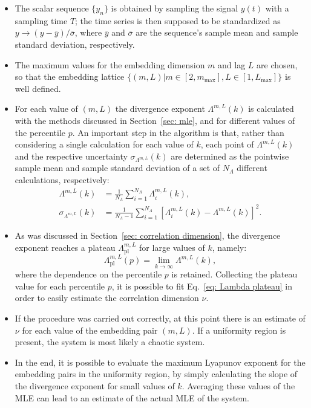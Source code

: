 \begin{itemize}

\item
The scalar sequence $\{y_n\}$ is obtained by sampling the signal $y(t)$ with a sampling time $T$;
the time series is then supposed to be standardized as
$y \rightarrow (y - \bar{y})/\bar{\sigma}$, where $\bar{y}$ and $\bar{\sigma}$ are the sequence's
sample mean and sample standard deviation, respectively.


\item
The maximum values for the embedding dimension $m$ and lag $L$ are chosen, so that the embedding
lattice $\{(m,L)|m\in[2,m_{\max}],L\in[1,L_{\max}]\}$ is well defined.


\item
For each value of $(m,L)$ the divergence exponent $\Lambda^{m,L}(k)$ is calculated with the methods
discussed in Section~\ref{sec: mle}, and for different values of the percentile $p$.
An important step in the algorithm is that, rather than
considering a single calculation for each value of $k$, each point of $\Lambda^{m,L}(k)$
and the respective uncertainty $\sigma_{\Lambda^{m,L}}(k)$ are determined
as the pointwise sample mean and sample standard
deviation of a set of $N_\Lambda$ different calculations, respectively:
\begin{equation}
\begin{aligned}
    \label{eq: sample mean divergence exponent}
    \Lambda^{m,L}(k)&=\frac{1}{N_\Lambda}\sum_{i=1}^{N_\Lambda}\Lambda_i^{m,L}(k),\\
    \sigma_{\Lambda^{m,L}}(k) &= \frac{1}{N_\Lambda-1}\sum_{i=1}^{N_\Lambda}{\left[
        \Lambda_i^{m,L}(k)-\Lambda^{m,L}(k)
    \right]}^2.
\end{aligned}
\end{equation}


\item
As was discussed in Section~\ref{sec: correlation dimension}, the divergence exponent reaches a plateau
$\Lambda_{\text{pl}}^{m,L}$ for large values of $k$, namely:
\begin{equation}
    \label{eq: Lambda plateau k infinity}
    \Lambda_{\text{pl}}^{m,L}(p) = \lim_{k\rightarrow \infty}\Lambda^{m,L}(k),
\end{equation}
where the dependence on the percentile $p$ is retained.
Collecting the plateau value for each percentile $p$, it is possible to fit Eq.~\ref{eq: Lambda plateau}
in order to easily estimate the correlation dimension $\nu$.


\item
If the procedure was carried out correctly, at this point there is an estimate of $\nu$ for each
value of the embedding pair $(m,L)$. If a uniformity region is present, the system is most likely
a chaotic system.


\item
In the end, it is possible to evaluate the
maximum Lyapunov exponent for the embedding pairs in the uniformity region, by simply calculating
the slope of the divergence exponent for small values of $k$. Averaging these values of the MLE
can lead to an estimate of the actual MLE of the system.

\end{itemize}

